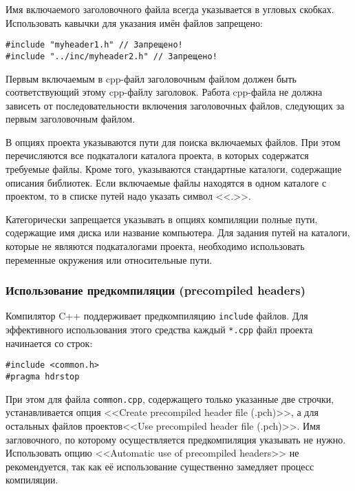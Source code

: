 Имя включаемого заголовочного файла всегда указывается в угловых скобках. Использовать кавычки для указания имён файлов запрещено:

\begin{lstlisting}[frame=single,numbers=none]
#include "myheader1.h" // Запрещено!
#include "../inc/myheader2.h" // Запрещено!
\end{lstlisting}

Первым включаемым в cpp-файл заголовочным файлом должен быть соответствующий этому cpp-файлу заголовок. Работа cpp-файла не должна зависеть от последовательности включения заголовочных файлов, следующих за первым заголовочным файлом.

В опциях проекта указываются пути для поиска включаемых файлов. При этом перечисляются все подкаталоги каталога проекта, в которых содержатся требуемые файлы. Кроме того, указываются стандартные каталоги, содержащие описания библиотек. Если включаемые файлы находятся в одном каталоге с проектом, то в списке путей надо указать символ <<.>>. 

Категорически запрещается указывать в опциях компиляции полные пути, содержащие имя диска или название компьютера. Для задания путей на каталоги, которые не являются подкаталогами проекта, необходимо использовать переменные окружения или относительные пути.

\subsubsection{Использование предкомпиляции (precompiled headers)}

Компилятор C++ поддерживает предкомпиляцию \lstinline|include| файлов. Для эффективного использования этого средства каждый \lstinline|*.cpp| файл проекта начинается со строк:

\begin{lstlisting}[frame=single,numbers=none]
#include <common.h>
#pragma hdrstop
\end{lstlisting}

При этом для файла \lstinline|common.cpp|, содержащего только указанные две строчки, устанавливается опция <<Create precompiled header file (.pch)>>, а для остальных файлов проектов\mdash <<Use precompiled header file (.pch)>>. Имя загловочного, по которому осуществляется предкомпиляция указывать не нужно. Использовать опцию <<Automatic use of precompiled headers>> не рекомендуется, так как её использование существенно замедляет процесс компиляции.

